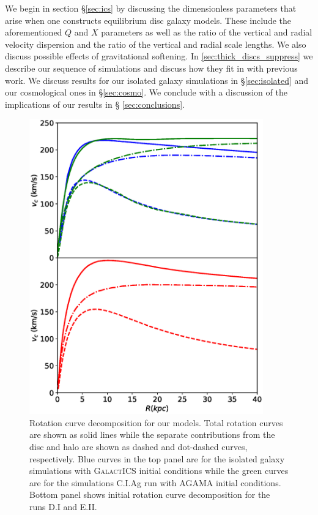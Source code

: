 We begin in section \S \ref{sec:ics} by discussing the dimensionless
parameters that arise when one constructs equilibrium disc galaxy
models.  These include the aforementioned $Q$ and $X$ parameters as
well as the ratio of the vertical and radial velocity dispersion and
the ratio of the vertical and radial scale lengths.  We also discuss
possible effects of gravitational softening.  In
\ref{sec:thick_discs_suppress} we describe our sequence of simulations
and discuss how they fit in with previous work.  We discuss results
for our isolated galaxy simulations in \S \ref{sec:isolated} and our
cosmological ones in \S \ref{sec:cosmo}.  We conclude with a
discussion of the implications of our results in \S
\ref{sec:conclusions}.

\begin{figure}
	\centering
	\includegraphics[width=0.9\textwidth]{../figures/rotation_curves_two_panel.eps}
	\caption{Rotation curve decomposition for our models. Total
          rotation curves are shown as solid lines while the separate
          contributions from the disc and halo are shown as dashed and
          dot-dashed curves, respectively.  Blue curves in the top
          panel are for the isolated galaxy simulations with
          \textsc{GalactICS} initial conditions while the green curves
          are for the simulations C.I.Ag run with \textsc{AGAMA}
          initial conditions.  Bottom panel shows initial rotation
          curve decomposition for the runs D.I and
          E.II.}\label{fig:rcs}
\end{figure}

